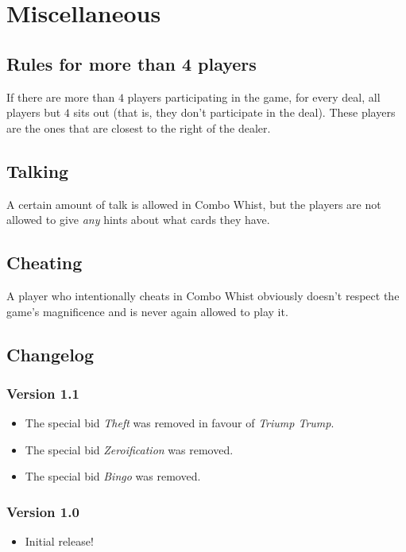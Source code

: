 \documentclass[a4paper]{article}
\begin{document}
	\section{Miscellaneous}{%
		\subsection{Rules for more than 4 players}{%
			If there are more than $4$ players participating in the game, for every deal, all players but $4$ sits out (that is, they don't participate in the deal). These players are the ones that are closest to the right of the dealer.
			
			
		}
		
		\subsection{Talking}{%
			A certain amount of talk is allowed in Combo Whist, but the players are not allowed to give \emph{any} hints about what cards they have.
		}
		
		\subsection{Cheating}{%
			A player who intentionally cheats in Combo Whist obviously doesn't respect the game's magnificence and is never again allowed to play it.
		}

		\subsection{Changelog}{%
			\subsubsection{Version 1.1}
			\begin{itemize}
				\item The special bid \emph{Theft} was removed in favour of \emph{Triump Trump}.
				\item The special bid \emph{Zeroification} was removed.
				\item The special bid \emph{Bingo} was removed.
			\end{itemize}
			\subsubsection{Version 1.0}
			\begin{itemize}
				\item Initial release!
			\end{itemize}
		}
	}
\end{document}

